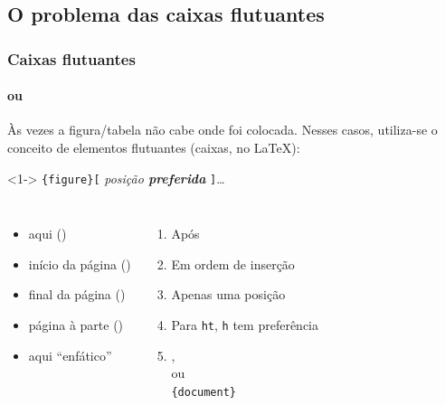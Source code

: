\documentclass[handout,10pt]{beamer}
\begin{document}
\subsection{O problema das caixas flutuantes}
\begin{frame}[fragile]
	\frametitle{Caixas flutuantes}
	\framesubtitle{ou }
	
	Às vezes a figura/tabela não cabe onde foi colocada. Nesses casos, utiliza-se
	o conceito de elementos flutuantes (caixas, no \LaTeX):
	
	\begin{block}<1->{}
		\centering
		\verb|{figure}[|%
			\textit{posição \textbf{preferida}}%
		\verb|]|\dots
	\end{block}
	
	\small
	\begin{columns}
		\begin{itemize}
			\item<2->[\texttt{h}] aqui ()
			\item<3->[\texttt{t}] início da página ()
			\item<4->[\texttt{b}] final da página ()
			\item<5->[\texttt{p}] página à parte ()
			\item<6->[\texttt{H}] aqui ``enfático''
		\end{itemize}
	
		\begin{enumerate}
			\item<7-> Após 
			\item<8-> Em ordem de inserção
			\item<9-> Apenas uma posição
			\item<10-> Para \texttt{ht}, \texttt{h} tem preferência
			\item<11-> ,\\  ou\\
				\verb|{document}|
		\end{enumerate}
	\end{columns}
		
\end{frame}
\end{document}
